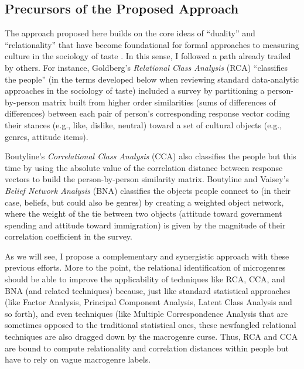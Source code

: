 \documentclass[a4paper,12pt]{extarticle}
\begin{document}
\subsection{Precursors of the Proposed Approach}
The approach proposed here builds on the core ideas of ``duality'' and ``relationality'' that have become foundational for formal approaches to measuring culture in the sociology of taste \citep{mutzel2020duality, mohr2015formal}. In this sense, I followed a path already trailed by others. For instance, Goldberg's \citeyearpar{goldberg2011mapping} {\em Relational Class Analysis} (RCA) ``classifies the people'' (in the terms developed below when reviewing standard data-analytic approaches in the sociology of taste) included a survey by partitioning a person-by-person matrix built from higher order similarities (sums of differences of differences) between each pair of person's corresponding response vector coding their stances (e.g., like, dislike, neutral) toward a set of cultural objects (e.g., genres, attitude items). 

Boutyline's 
\citeyearpar{boutyline2017improving} {\em Correlational Class Analysis} (CCA) also classifies the people but this time by using the absolute value of the correlation distance between response vectors to build the person-by-person similarity matrix. Boutyline and Vaisey's {\em Belief Network Analysis} (BNA) classifies the objects people connect to (in their case, beliefs, but could also be genres) by creating a weighted object network, where the weight of the tie between two objects (attitude toward government spending and attitude toward immigration) is given by the magnitude of their correlation coefficient in the survey. 

As we will see, I propose a complementary and synergistic approach with these previous efforts. More to the point, the relational identification of microgenres should be able to improve the applicability of techniques like RCA, CCA, and BNA (and related techniques) because, just like standard statistical approaches (like Factor Analysis, Principal Component Analysis, Latent Class Analysis and so forth), and even techniques (like Multiple Correspondence Analysis that are sometimes opposed to the traditional statistical ones, these newfangled relational techniques are also dragged down by the macrogenre curse. Thus, RCA and CCA are bound to compute relationality and correlation distances within people but have to rely on vague macrogenre labels. 
\end{document}
